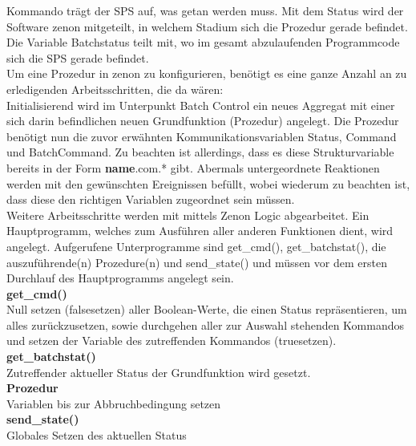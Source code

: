 	Kommando trägt der SPS auf, was getan werden muss. Mit dem Status wird der Software zenon mitgeteilt, in welchem Stadium sich die Prozedur gerade befindet. Die Variable Batchstatus teilt mit, wo im gesamt abzulaufenden Programmcode sich die SPS gerade befindet.\\
	
	Um eine Prozedur in zenon zu konfigurieren, benötigt es eine ganze Anzahl an zu erledigenden Arbeitsschritten, die da wären:\\

	Initialisierend wird im Unterpunkt Batch Control ein neues Aggregat mit einer sich darin befindlichen neuen Grundfunktion (Prozedur) angelegt. Die Prozedur benötigt nun die zuvor erwähnten Kommunikationsvariablen Status, Command und BatchCommand. Zu beachten ist allerdings, dass es diese Strukturvariable bereits in der Form \glqq \textbf{name}.com.* \grqq \space gibt. Abermals untergeordnete Reaktionen werden mit den gewünschten Ereignissen befüllt, wobei wiederum zu beachten ist, dass diese den richtigen Variablen zugeordnet sein müssen.\\

	Weitere Arbeitsschritte werden mit mittels Zenon Logic abgearbeitet. Ein Hauptprogramm, welches zum Ausführen aller anderen Funktionen dient, wird angelegt. Aufgerufene Unterprogramme sind get\_cmd(), get\_batchstat(), die auszuführende(n) Prozedure(n) und send\_state() und müssen vor dem ersten Durchlauf des Hauptprogramms angelegt sein.\\
	
	\textbf{get\_cmd()}\\
	Null setzen (\glqq false\grqq \space setzen) aller Boolean-Werte, die einen Status repräsentieren, um alles zurückzusetzen, sowie durchgehen aller zur Auswahl stehenden Kommandos und setzen der Variable des zutreffenden Kommandos (\glqq true\grqq \space setzen).\\

	\textbf{get\_batchstat()}\\
		Zutreffender aktueller Status der Grundfunktion wird gesetzt.\\

	\textbf{Prozedur}\\
		Variablen bis zur Abbruchbedingung setzen\\

	\textbf{send\_state()}\\
		Globales Setzen des aktuellen Status
		
